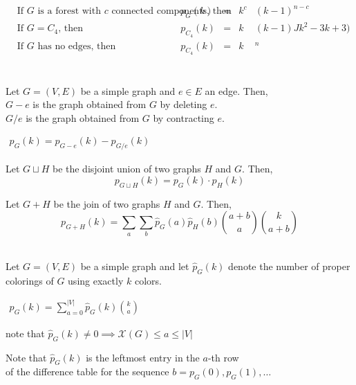 \documentclass[12pt]{article}
\begin{document}
	\begin{tcolorbox}
	\\
	
	\hfill
	$\begin{aligned}
	&\text{If $G$ is a forest with $c$ connected components, then} \quad &p_G(k) &=& k^c&(k-1)^{n-c} \\
	&\text{If $G = C_4$, then} \quad &p_{C_4}(k) &=& k&(k-1)Jk^2-3k+3) \\
	&\text{If $G$ has no edges, then} \quad &p_{C_4}(k) &=& k&^n \\
	\end{aligned}$
	\end{tcolorbox}
	
	\begin{tcolorbox}
	\\
	Let $G =(V,E)$ be a simple graph and $e \in E$ an edge. Then, \\
	$G-e$ is the graph obtained from $G$ by deleting $e$.\\
	$G/e$ is the graph obtained from $G$ by contracting $e$.\\
	\hfill
	\begin{center}
	$\begin{aligned}
	p_G(k) = p_{G-e}(k) - p_{G/e}(k)
	\end{aligned}$
	\end{center}
	
	\hfill
	
	Let $G \sqcup H$ be the disjoint union of two graphs $H$ and $G$. Then,
	$$p_{G \sqcup H}(k) =p_G(k)  \cdot p_H(k)$$ 
	
	\hfill
	
	Let $G + H$ be the join of two graphs $H$ and $G$. Then,
	$$p_{G +H}(k) = \sum_a \sum_b \hat{p}_{G}(a)\hat{p}_H(b) {a+b \choose a} {k \choose a+b}$$
	\end{tcolorbox}
	
	\begin{tcolorbox}
	\\
	Let $G =(V,E)$ be a simple graph and let $\hat{p}_G(k)$ denote the number of proper colorings of $G$ using exactly $k$ colors.
	\hfill
	\begin{center}
	$\begin{aligned}
	p_G(k) = \sum_{a= 0}^{|V|} \hat{p}_G(k) { k \choose a}
	\end{aligned}$
	\end{center}
	\hfill note that $\hat{p}_G(k) \ne 0 \implies \mathcal{X}(G) \le a \le |V|$
	
	Note that $ \hat{p}_G(k)$ is the leftmost entry in the $a$-th row \\ of the difference table for the sequence $b = p_G(0), p_G(1), \dots$
	\end{tcolorbox}
	
\end{document}

